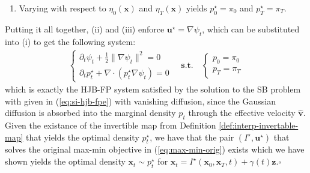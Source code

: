 \documentclass{article}
\newcommand{\bluetext}[1]{\textcolor{customblue}{#1}}
\begin{document}
\begin{enumerate}
    \begin{small}
    \begin{align}
        \int_0^T\int_{\mathbb{R}^d}\left[\frac{1}{2}\|\hat{\boldsymbol{u}}\|^2\hat p_t-\psi_t\partial_t\hat p_t\right]d\boldsymbol{x}dt&=\int_0^T\int_{\mathbb{R}^d}\left[\frac{1}{2}\|\hat{\boldsymbol{u}}\|^2\hat p_t+(\partial_t\psi_t)\hat p_t\right]d\boldsymbol{x}dt\nonumber\\
        &=\int_0^T\int_{\mathbb{R}^d}\bluetext{\underbrace{\left[\frac{1}{2}\|\hat{\boldsymbol{u}}\|^2+(\partial_t\psi_t)\right]}_{\text{vanishes pointwise at minimum}}}\hat p_td\boldsymbol{x}dt\nonumber\\
        &\implies  \bluetext{\partial_t\psi_t+\frac{1}{2}\|\boldsymbol{u}^\star\|^2=0}
    \end{align}
    \end{small}
    \item[(v)] Varying with respect to $\eta_0(\boldsymbol{x})$ and $\eta_T(\boldsymbol{x})$ yields $p_0^\star=\pi_0$ and $p^\star_T=\pi_T$.
\end{enumerate}
Putting it all together, (ii) and (iii) enforce $\boldsymbol{u}^\star=\nabla \psi_t$, which can be substituted into (i) to get the following system:
\begin{align}
    \begin{cases}
        \partial_t\psi_t+\frac{1}{2}\|\nabla\psi_t\|^2=0\\
        \partial_tp^\star_t+\nabla \cdot(p_t^\star\nabla \psi_t)=0
    \end{cases}\quad \textbf{s.t.}\quad\begin{cases}
        p_0=\pi_0\\
        p_T=\pi_T
    \end{cases}
\end{align}
which is exactly the HJB-FP system satisfied by the solution to the SB problem with given in (\ref{eq:si-hjb-fpe}) with vanishing diffusion, since the Gaussian diffusion is absorbed into the marginal density $p_t$ through the effective velocity $\hat{\boldsymbol{v}}$. Given the existance of the invertible map from Definition \ref{def:interp-invertable-map} that yields the optimal density $p^\star_t$, we have that the pair $(I^\star, \boldsymbol{u}^\star)$ that solves the original max-min objective in (\ref{eq:max-min-orig}) exists which we have shown yields the optimal density $\boldsymbol{x}_t\sim p^\star_t$ for $\boldsymbol{x}_t=I^\star(\boldsymbol{x}_0, \boldsymbol{x}_T,t)+\gamma(t)\boldsymbol{z}$.\hfill $\square$
\end{document}
